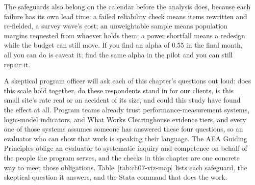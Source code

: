 \documentclass[
    a4paper,
    fontsize=10pt,
    twoside=true,
    numbers=noenddot,
]{kaobook}
\begin{document}
The safeguards also belong on the calendar before the analysis does, because each failure has its own lead time: a failed reliability check means items rewritten and re-fielded, a survey wave's cost; an unweightable sample means population margins requested from whoever holds them; a power shortfall means a redesign while the budget can still move. If you find an alpha of 0.55 in the final month, all you can do is caveat it; find the same alpha in the pilot and you can still repair it.

A skeptical program officer will ask each of this chapter's questions out loud: does this scale hold together, do these respondents stand in for our clients, is this small site's rate real or an accident of its size, and could this study have found the effect at all. Program teams already trust performance-measurement systems, logic-model indicators, and What Works Clearinghouse evidence tiers, and every one of those systems assumes someone has answered these four questions, so an evaluator who can show that work is speaking their language. The AEA Guiding Principles oblige an evaluator to systematic inquiry and competence on behalf of the people the program serves, and the checks in this chapter are one concrete way to meet those obligations. Table~\ref{tab:ch07-viz-map} lists each safeguard, the skeptical question it answers, and the Stata command that does the work.
\end{document}

